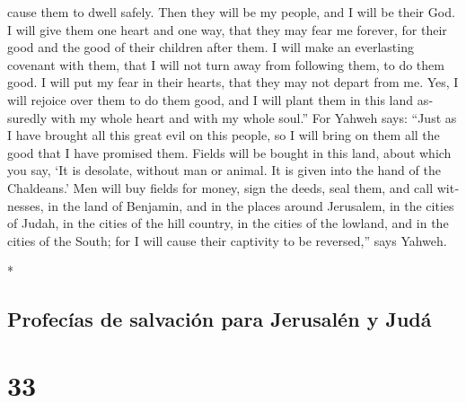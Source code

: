 \begin{paracol}{2}
\begin{otherlanguage}{english}
cause them to dwell safely.  Then they will be my people,
and I will be their God.  I will give them one heart and
one way, that they may fear me forever, for their good and the good of
their children after them.  I will make an everlasting
covenant with them, that I will not turn away from following them, to do
them good. I will put my fear in their hearts, that they may not depart
from me.  Yes, I will rejoice over them to do them good,
and I will plant them in this land assuredly with my whole heart and
with my whole soul.''  For Yahweh says: ``Just as I have
brought all this great evil on this people, so I will bring on them all
the good that I have promised them.  Fields will be
bought in this land, about which you say, `It is desolate, without man
or animal. It is given into the hand of the Chaldeans.' 
Men will buy fields for money, sign the deeds, seal them, and call
witnesses, in the land of Benjamin, and in the places around Jerusalem,
in the cities of Judah, in the cities of the hill country, in the cities
of the lowland, and in the cities of the South; for I will cause their
captivity to be reversed,'' says Yahweh.

\end{otherlanguage}

\switchcolumn[0]*

\hypertarget{profecuxedas-de-salvaciuxf3n-para-jerusaluxe9n-y-juduxe1}{%
\subsection{Profecías de salvación para Jerusalén y
Judá}\label{profecuxedas-de-salvaciuxf3n-para-jerusaluxe9n-y-juduxe1}}

\hypertarget{section-64}{%
\section{33}\label{section-64}}


\end{paracol}
